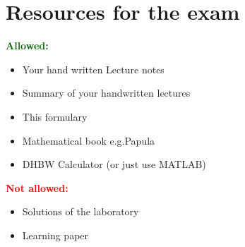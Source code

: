 \section{Resources for the exam}

\textbf{\textcolor{darkgreen}{Allowed:}}
\begin{itemize}
	\renewcommand\labelitemi{$\checkmark$} 
	\item Your hand written Lecture notes
	\item Summary of your handwritten lectures
	\item This formulary
	\item Mathematical book e.g.Papula
	\item DHBW Calculator (or just use MATLAB)
\end{itemize}


\textbf{\textcolor{red}{Not allowed:}}
\begin{itemize}
	\renewcommand\labelitemi{$\times$}
	\item Solutions of the laboratory
	\item Learning paper
\end{itemize}